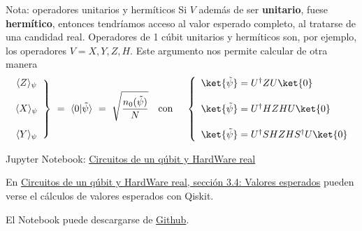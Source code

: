 \documentclass[a4paper,11pt]{book} %
\numberwithin{equation}{chapter}
\newcommand{\braket}[2]{\langle #1|#2\rangle}
\begin{document}
	\begin{mybox_blue}{Nota: operadores unitarios y hermíticos}
	Si $V$ además de ser \textbf{unitario}, fuese \textbf{hermítico}, entonces tendríamos acceso al valor esperado completo, 
	al tratarse de una candidad real. 
	Operadores de 1 cúbit unitarios y hermíticos son, por ejemplo, los operadores $V = X,Y,Z,H$. 	
	Este argumento nos permite calcular de otra manera 	
	\begin{equation} \label{ec_medidas1_valores_esperados_XYZ}
	\left. 
	\begin{array}{c} \langle Z\rangle_\psi \\ \rule{0mm}{8mm} \langle X\rangle_\psi \\ \rule{0mm}{8mm} \langle Y\rangle_\psi \end{array}
	\right\} ~=~\braket{0}{\tilde\psi} ~=~ \sqrt{\frac{n_{0}(\tilde\psi)}{N}} ~~~\hbox{con}~~~~
	\left\{ 
	\begin{array}{l}  \ket{\tilde \psi} = U^\dagger  Z  U\ket{0} \\ \rule{0mm}{8mm} \ket{\tilde \psi} = U^\dagger H Z H U\ket{0}  \\ 
	\rule{0mm}{8mm}  \ket{\tilde \psi} = U^\dagger SH Z HS^\dagger U\ket{0} \end{array}
	\right.
	\end{equation}
	
	\end{mybox_blue}
	
    
		
	\begin{mybox_orange}{Jupyter Notebook: \href{https://www.scbi.uma.es/web/wp-content/uploads/Jupyterbook/CICC_UMA/Notebooks/html/docs/Part_01/Chapter_03-Circuitos_1_qubit_medidas_y_RealHardware_myst.html}{Circuitos de un qúbit y HardWare real}}
	
	En \href{https://www.scbi.uma.es/web/wp-content/uploads/Jupyterbook/CICC_UMA/Notebooks/html/docs/Part_01/Chapter_03-Circuitos_1_qubit_medidas_y_RealHardware_myst.html#valores-esperados}{Circuitos de un qúbit y HardWare real, sección 3.4: Valores esperados} pueden verse el cálculos de valores esperados con Qiskit.
	
	El Notebook puede descargarse de \href{https://github.com/davidcb98/CICC_UMA/blob/master/Notebooks/Part_01/Chapter_03-Circuitos_1_qubit_medidas_y_RealHardware.ipynb}{Github}.
	\end{mybox_orange}
    
		
		
		
		
\end{document}
